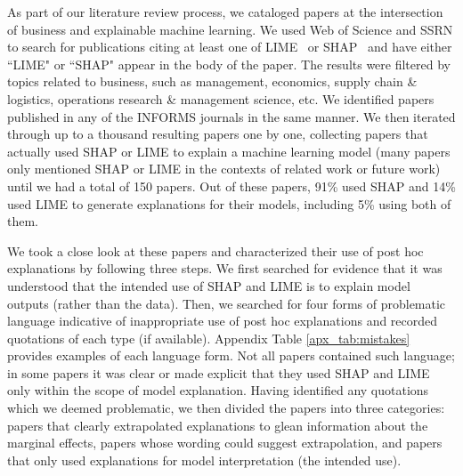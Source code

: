 \documentclass[mnsc,blindrev]{informs3}
\begin{document}
        As part of our literature review process, we cataloged papers at the intersection of business and explainable machine learning. We used Web of Science and SSRN to search for publications citing at least one of LIME~\citep{ribeiro16lime} or SHAP~\citep{lundberg17shap} and have either ``LIME" or ``SHAP" appear in the body of the paper.  The results were filtered by topics related to business, such as management, economics, supply chain \& logistics, operations research \& management science, etc. We identified papers published in any of the INFORMS journals in the same manner. We then iterated through up to a thousand resulting papers one by one, collecting papers that actually used SHAP or LIME to explain a machine learning model (many papers only mentioned SHAP or LIME in the contexts of related work or future work) until we had a total of 150 papers. Out of these papers, 91\% used SHAP and 14\% used LIME to generate explanations for their models, including 5\% using both of them.

        
        We took a close look at these papers and characterized their use of post hoc explanations by following three steps. We first searched for evidence that it was understood that the intended use of SHAP and LIME is to explain model outputs (rather than the data). Then, we searched for four forms of problematic language indicative of inappropriate use of post hoc explanations and recorded quotations of each type (if available). Appendix Table \ref{apx_tab:mistakes} provides examples of each language form. Not all papers contained such language; in some papers it was clear or made explicit that they used SHAP and LIME only within the scope of model explanation. Having identified any quotations which we deemed problematic, we then divided the papers into three categories: papers that clearly extrapolated explanations to glean information about the marginal effects, papers whose wording could suggest extrapolation, and papers that only used explanations for model interpretation (the intended use).%
\end{document}
